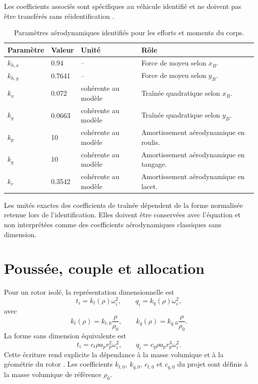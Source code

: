 \documentclass[11pt,a4paper,oneside]{report}
\begin{document}
	
	
	
	
	Les coefficients associés sont spécifiques au véhicule identifié et ne doivent pas être transférés sans réidentification \cite{BauerNagy2024}.
	
	\begin{table}[H]
		\centering
		\caption{Paramètres aérodynamiques identifiés pour les efforts et moments du corps.}
		\label{tab_aero_coefficients}
		\begin{tabularx}{\textwidth}{@{}L{3.5cm}L{3.0cm}L{2.3cm}Y@{}}
			\toprule
			\textbf{Paramètre} & \textbf{Valeur} & \textbf{Unité} & \textbf{Rôle}\\
			\midrule
			$k_{h,x}$ & \num{0.94} & -- & Force de moyeu selon $x_B$.\\
			$k_{h,y}$ & \num{0.7641} & -- & Force de moyeu selon $y_B$.\\
			$k_x$ & \num{0.072} & cohérente au modèle & Traînée quadratique selon $x_B$.\\
			$k_y$ & \num{0.0663} & cohérente au modèle & Traînée quadratique selon $y_B$.\\
			$k_p$ & \num{10} & cohérente au modèle & Amortissement aérodynamique en roulis.\\
			$k_q$ & \num{10} & cohérente au modèle & Amortissement aérodynamique en tangage.\\
			$k_r$ & \num{0.3542} & cohérente au modèle & Amortissement aérodynamique en lacet.\\
			\bottomrule
		\end{tabularx}
	\end{table}
	Les unités exactes des coefficients de traînée dépendent de la forme normalisée retenue lors de l'identification. Elles doivent être conservées avec l'équation et non interprétées comme des coefficients aérodynamiques classiques sans dimension.
	
	\section{Poussée, couple et allocation}
	Pour un rotor isolé, la représentation dimensionnelle est
	\begin{equation}
		t_i=k_t(\rho)\omega_i^2,
		\qquad
		q_i=k_q(\rho)\omega_i^2,
		\label{eq_rotor_dimensional}
	\end{equation}
	avec
	\begin{equation}
		k_t(\rho)=k_{t,0}\frac{\rho}{\rho_0},
		\qquad
		k_q(\rho)=k_{q,0}\frac{\rho}{\rho_0}.
		\label{eq_density_scaling}
	\end{equation}
	La forme sans dimension équivalente est
	\begin{equation}
		t_i=c_t\rho a_pr_p^2\omega_i^2,
		\qquad
		q_i=c_q\rho a_pr_p^3\omega_i^2.
		\label{eq_rotor_nondimensional}
	\end{equation}
	Cette écriture rend explicite la dépendance à la masse volumique et à la géométrie du rotor \cite{Vu2019}. Les coefficients $k_{t,0}$, $k_{q,0}$, $c_{t,0}$ et $c_{q,0}$ du projet sont définis à la masse volumique de référence $\rho_0$.
	
\end{document}
